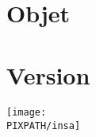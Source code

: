 
\maketitle

\thispagestyle{empty}

\hfill\\
\vfill

\section*{Objet}
\Object

\section*{Version}
\Version

\begin{center}
    \texttt{[image: \\PIXPATH/insa]}\hfill\\
\end{center}


\pagebreak
